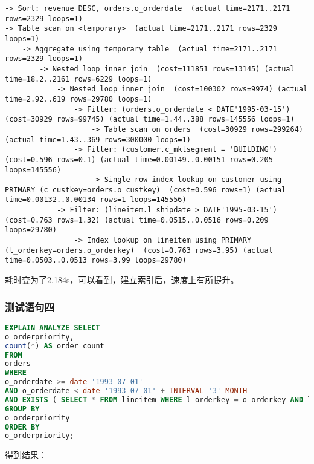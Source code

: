 \documentclass{article}
\begin{document}
\begin{lstlisting}
-> Sort: revenue DESC, orders.o_orderdate  (actual time=2171..2171 rows=2329 loops=1)
-> Table scan on <temporary>  (actual time=2171..2171 rows=2329 loops=1)
    -> Aggregate using temporary table  (actual time=2171..2171 rows=2329 loops=1)
        -> Nested loop inner join  (cost=111851 rows=13145) (actual time=18.2..2161 rows=6229 loops=1)
            -> Nested loop inner join  (cost=100302 rows=9974) (actual time=2.92..619 rows=29780 loops=1)
                -> Filter: (orders.o_orderdate < DATE'1995-03-15')  (cost=30929 rows=99745) (actual time=1.44..388 rows=145556 loops=1)
                    -> Table scan on orders  (cost=30929 rows=299264) (actual time=1.43..369 rows=300000 loops=1)
                -> Filter: (customer.c_mktsegment = 'BUILDING')  (cost=0.596 rows=0.1) (actual time=0.00149..0.00151 rows=0.205 loops=145556)
                    -> Single-row index lookup on customer using PRIMARY (c_custkey=orders.o_custkey)  (cost=0.596 rows=1) (actual time=0.00132..0.00134 rows=1 loops=145556)
            -> Filter: (lineitem.l_shipdate > DATE'1995-03-15')  (cost=0.763 rows=1.32) (actual time=0.0515..0.0516 rows=0.209 loops=29780)
                -> Index lookup on lineitem using PRIMARY (l_orderkey=orders.o_orderkey)  (cost=0.763 rows=3.95) (actual time=0.0503..0.0513 rows=3.99 loops=29780)
\end{lstlisting}

耗时变为了2.184s，可以看到，建立索引后，速度上有所提升。

\subsubsection{测试语句四}

\begin{lstlisting}[language=sql]
EXPLAIN ANALYZE SELECT
o_orderpriority,
count(*) AS order_count 
FROM
orders 
WHERE
o_orderdate >= date '1993-07-01' 
AND o_orderdate < date '1993-07-01' + INTERVAL '3' MONTH 
AND EXISTS ( SELECT * FROM lineitem WHERE l_orderkey = o_orderkey AND l_commitdate < l_receiptdate ) 
GROUP BY
o_orderpriority 
ORDER BY
o_orderpriority;
\end{lstlisting}

得到结果：
\end{document}
